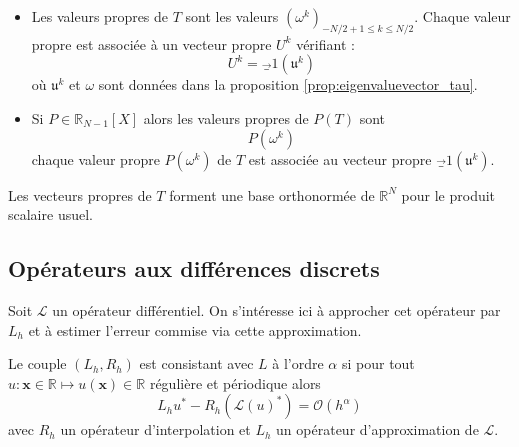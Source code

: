 \begin{corollaire}
\begin{itemize}
\item Les valeurs propres de $T$ sont les valeurs $(\omega^k)_{-N/2+1 \leq k \leq N/2}$. 
Chaque valeur propre est associée à un vecteur propre $U^k$ vérifiant :
\begin{equation}
U^k = \vec_1 (\mathfrak{u}^k )
\label{eq:eigenvectorT}
\end{equation}
où $\mathfrak{u}^k$ et $\omega$ sont données dans la proposition \ref{prop:eigenvaluevector_tau}.

\item Si $P \in \mathbb{R}_{N-1}[X]$ alors les valeurs propres de $P(T)$ sont 
\begin{equation}
P(\omega^k)
\end{equation}
chaque valeur propre $P(\omega^k)$ de $T$ est associée au vecteur propre $\vec_1 (\mathfrak{u}^k )$.
\end{itemize}
\label{prop:eigen_P(tau)}
\end{corollaire}

Les vecteurs propres de $T$ forment une base orthonormée de $\mathbb{R}^N$ pour le produit scalaire usuel.



















\subsection{Opérateurs aux différences discrets}

Soit $\mathcal{L}$ un opérateur différentiel. On s'intéresse ici à approcher cet opérateur par $L_h$ et à estimer l'erreur commise via cette approximation.

\begin{definition}
Le couple $(L_h, R_h)$ est consistant avec $L$ à l'ordre $\alpha$ si pour tout $u : \mathbf{x} \in \mathbb{R} \mapsto u(\mathbf{x}) \in \mathbb{R}$ régulière et périodique alors 
\begin{equation}
L_h u^* - R_h (\mathcal{L}(u)^*) = \mathcal{O} \left ( h^{\alpha} \right)
\end{equation}
avec $R_h$ un opérateur d'interpolation et $L_h$ un opérateur d'approximation de $\mathcal{L}$.
\end{definition}





